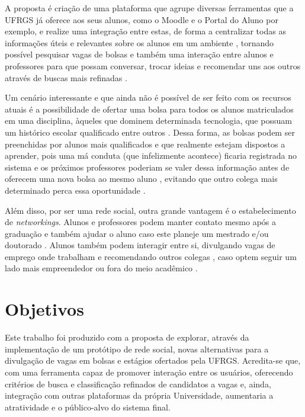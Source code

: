 \documentclass[cic,tc]{iiufrgs}
\begin{document}
A proposta é criação de uma plataforma que agrupe diversas ferramentas que a UFRGS já oferece aos seus alunos, como o Moodle e o Portal do Aluno por exemplo, e realize uma integração entre estas, de forma a centralizar todas as informações úteis e relevantes sobre os alunos em um ambiente \cite{socConnectArticle}, tornando possível pesquisar vagas de bolsas e também uma interação entre alunos e professores para que possam conversar, trocar ideias e recomendar uns aos outros através de buscas mais refinadas \cite{UXLinkedinArticle} \cite{agileCareerArticle}. 

Um cenário interessante e que ainda não é possível de ser feito com os recursos atuais é a possibilidade de ofertar uma bolsa para todos os alunos matriculados em uma disciplina, àqueles que dominem determinada tecnologia, que possuam um histórico escolar qualificado entre outros \cite{designCurriculumArticle} \cite{minigLinkedinInbook}. Dessa forma, as bolsas podem ser preenchidas por alunos mais
qualificados e que realmente estejam dispostos a aprender, pois uma má conduta (que infelizmente acontece) ficaria registrada no sistema e os próximos professores poderiam se valer dessa informação antes de oferecem uma nova bolsa ao mesmo aluno \cite{academicAchievmentArticle}, evitando que
outro colega mais determinado perca essa oportunidade \cite{futureITLinkedinArticle}. 

Além disso, por ser uma rede social, outra grande vantagem é o estabelecimento de \textit{networkings}. Alunos e professores podem manter contato mesmo após a graduação e também ajudar o aluno caso este planeje um mestrado e/ou doutorado \cite{alumniInbook}. Alunos também podem interagir entre si, divulgando vagas de emprego onde trabalham e recomendando outros colegas \cite{recommendPeopleInbook}, caso optem seguir um lado mais empreendedor \cite{SNsEntrepreunersInbook} ou fora do meio acadêmico \cite{globalParticipationInbook}.


\section{Objetivos}
\label{introducaoObjetivos}
Este trabalho foi produzido com a proposta de explorar, através da implementação de um protótipo de rede social, novas alternativas para a divulgação de vagas em bolsas e estágios ofertados pela UFRGS. Acredita-se que, com uma ferramenta capaz de promover interação entre os usuários, oferecendo critérios de busca e classificação refinados de candidatos a vagas e, ainda, integração com outras plataformas da própria Universidade, aumentaria a atratividade e o público-alvo do sistema final.
\end{document}
